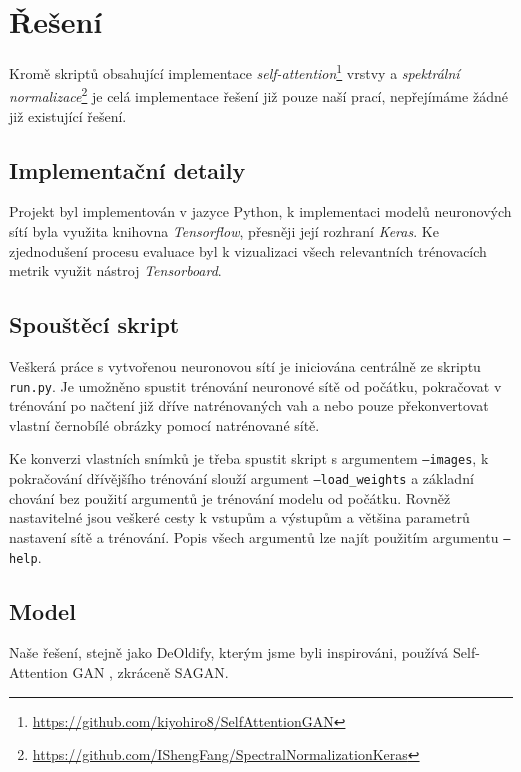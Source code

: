\documentclass[12pt, a4paper]{article}
\begin{document}
    \section{Řešení}
    Kromě skriptů obsahující implementace \textit{self-attention}\footnote{\url{https://github.com/kiyohiro8/SelfAttentionGAN}} vrstvy a \textit{spektrální normalizace}\footnote{\url{https://github.com/IShengFang/SpectralNormalizationKeras}} je celá implementace řešení již pouze naší prací, nepřejímáme žádné již existující řešení. 
    
    \subsection{Implementační detaily}
    Projekt byl implementován v jazyce Python, k implementaci modelů neuronových sítí byla využita knihovna \textit{Tensorflow}, přesněji její rozhraní \textit{Keras}. Ke zjednodušení procesu evaluace byl k vizualizaci všech relevantních trénovacích metrik využit nástroj \textit{Tensorboard}.
    
    \subsection{Spouštěcí skript}
    Veškerá práce s vytvořenou neuronovou sítí je iniciována centrálně ze skriptu \texttt{run.py}. Je umožněno spustit trénování neuronové sítě od počátku, pokračovat v trénování po načtení již dříve natrénovaných vah a nebo pouze překonvertovat vlastní černobílé obrázky pomocí natrénované sítě.
    
    Ke konverzi vlastních snímků je třeba spustit skript s argumentem \texttt{--images}, k pokračování dřívějšího trénování slouží argument \texttt{--load\_weights} a základní chování bez použití argumentů je trénování modelu od počátku. Rovněž nastavitelné jsou veškeré cesty k vstupům a výstupům a většina parametrů nastavení sítě a trénování. Popis všech argumentů lze najít použitím argumentu \texttt{--help}.
    
    \subsection{Model}
    Naše řešení, stejně jako DeOldify, kterým jsme byli inspirováni, používá Self-Attention GAN \cite{sagan}, zkráceně SAGAN.
    
\end{document}
